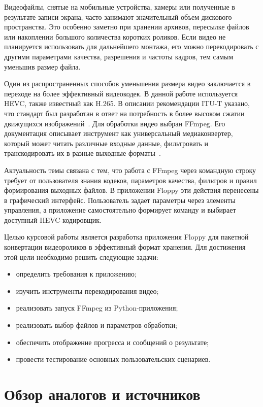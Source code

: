 \documentclass[14pt,a4paper]{extarticle}
\begin{document}
Видеофайлы, снятые на мобильные устройства, камеры или полученные в результате записи экрана, часто занимают значительный объем дискового пространства. Это особенно заметно при хранении архивов, пересылке файлов или накоплении большого количества коротких роликов. Если видео не планируется использовать для дальнейшего монтажа, его можно перекодировать с другими параметрами качества, разрешения и частоты кадров, тем самым уменьшив размер файла.

Один из распространенных способов уменьшения размера видео заключается в переходе на более эффективный видеокодек. В данной работе используется HEVC, также известный как H.265. В описании рекомендации ITU-T указано, что стандарт был разработан в ответ на потребность в более высоком сжатии движущихся изображений~\cite{h265}. Для обработки видео выбран FFmpeg. Его документация описывает инструмент как универсальный медиаконвертер, который может читать различные входные данные, фильтровать и транскодировать их в разные выходные форматы~\cite{ffmpeg}.

Актуальность темы связана с тем, что работа с FFmpeg через командную строку требует от пользователя знания кодеков, параметров качества, фильтров и правил формирования выходных файлов. В приложении Floppy эти действия перенесены в графический интерфейс. Пользователь задает параметры через элементы управления, а приложение самостоятельно формирует команду и выбирает доступный HEVC-кодировщик.

Целью курсовой работы является разработка приложения Floppy для пакетной конвертации видеороликов в эффективный формат хранения. Для достижения этой цели необходимо решить следующие задачи:

\begin{itemize}
	\item определить требования к приложению;
	\item изучить инструменты перекодирования видео;
	\item реализовать запуск FFmpeg из Python-приложения;
	\item реализовать выбор файлов и параметров обработки;
	\item обеспечить отображение прогресса и сообщений о результате;
	\item провести тестирование основных пользовательских сценариев.
\end{itemize}

\section{Обзор аналогов и источников}
\end{document}
